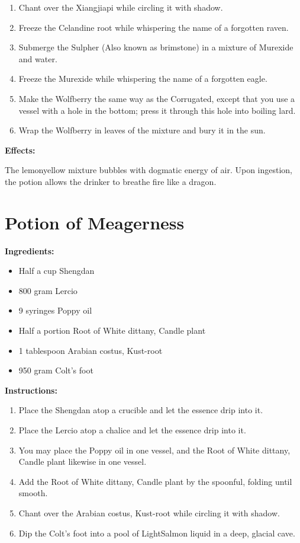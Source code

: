 \documentclass{article}
\begin{document}
\begin{enumerate}
  \item Chant over the Xiangjiapi while circling it with shadow.
  \item Freeze the Celandine root while whispering the name of a forgotten raven.
  \item Submerge the Sulpher (Also known as brimstone) in a mixture of Murexide and water.
  \item Freeze the Murexide while whispering the name of a forgotten eagle.
  \item Make the Wolfberry the same way as the Corrugated, except that you use a vessel with a hole in the bottom; press it through this hole into boiling lard.
  \item Wrap the Wolfberry in leaves of the mixture and bury it in the sun.
\end{enumerate}

\textbf{Effects:}

The lemonyellow mixture bubbles with dogmatic energy of air. Upon ingestion, the potion allows the drinker to breathe fire like a dragon.

\newpage
\section*{Potion of Meagerness}

\textbf{Ingredients:}

\begin{itemize}
  \item Half a cup Shengdan
  \item 800 gram Lercio
  \item 9 syringes Poppy oil
  \item Half a portion Root of White dittany, Candle plant
  \item 1 tablespoon Arabian costus, Kust-root
  \item 950 gram Colt's foot
\end{itemize}

\textbf{Instructions:}

\begin{enumerate}
  \item Place the Shengdan atop a crucible and let the essence drip into it.
  \item Place the Lercio atop a chalice and let the essence drip into it.
  \item You may place the Poppy oil in one vessel, and the Root of White dittany, Candle plant likewise in one vessel.
  \item Add the Root of White dittany, Candle plant by the spoonful, folding until smooth.
  \item Chant over the Arabian costus, Kust-root while circling it with shadow.
  \item Dip the Colt's foot into a pool of LightSalmon liquid in a deep, glacial cave.
\end{enumerate}
\end{document}

